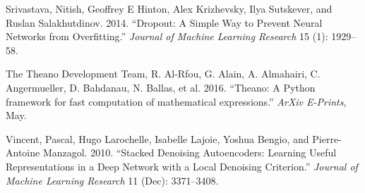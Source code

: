 \documentclass[11pt]{article}
\begin{document}
\hypertarget{ref-srivastava2014dropout}{}
Srivastava, Nitish, Geoffrey E Hinton, Alex Krizhevsky, Ilya Sutskever,
and Ruslan Salakhutdinov. 2014. ``Dropout: A Simple Way to Prevent
Neural Networks from Overfitting.'' \emph{Journal of Machine Learning
Research} 15 (1): 1929--58.

\hypertarget{ref-2016arXiv160502688T}{}
The Theano Development Team, R. Al-Rfou, G. Alain, A. Almahairi, C.
Angermueller, D. Bahdanau, N. Ballas, et al. 2016. ``Theano: A Python
framework for fast computation of mathematical expressions.''
\emph{ArXiv E-Prints}, May.

\hypertarget{ref-vincent2010stacked}{}
Vincent, Pascal, Hugo Larochelle, Isabelle Lajoie, Yoshua Bengio, and
Pierre-Antoine Manzagol. 2010. ``Stacked Denoising Autoencoders:
Learning Useful Representations in a Deep Network with a Local Denoising
Criterion.'' \emph{Journal of Machine Learning Research} 11 (Dec):
3371--3408.
\end{document}
